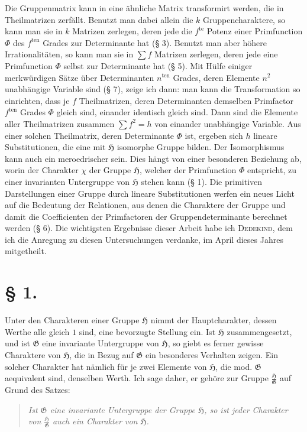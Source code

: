\documentclass[11pt]{article}
\newcommand{\Hgrp}{\mathfrak{H}}
\newcommand{\Ggrp}{\mathfrak{G}}
\newcommand{\ten}{\mathrm{ten}}
\begin{document}
Die Gruppenmatrix kann in eine ähnliche Matrix transformirt werden, die in Theilmatrizen zerfällt. Benutzt man dabei allein die $k$ Gruppencharaktere, so kann man sie in $k$ Matrizen zerlegen, deren jede die $f^{\mathrm{te}}$ Potenz einer Primfunction $\Phi$ des $f^{\ten}$ Grades zur Determinante hat (§ 3). Benutzt man aber höhere Irrationalitäten, so kann man sie in $\sum f$ Matrizen zerlegen, deren jede eine Primfunction $\Phi$ selbst zur Determinante hat (§ 5). Mit Hülfe einiger merkwürdigen Sätze über Determinanten $n^{\ten}$ Grades, deren Elemente $n^2$ unabhängige Variable sind (§ 7), zeige ich dann: man kann die Transformation so einrichten, dass je $f$ Theilmatrizen, deren Determinanten demselben Primfactor $f^{\ten}$ Grades $\Phi$ gleich sind, einander identisch gleich sind. Dann sind die Elemente aller Theilmatrizen zusammen $\sum f^2=h$ von einander unabhängige Variable. Aus einer solchen Theilmatrix, deren Determinante $\Phi$ ist, ergeben sich $h$ lineare Substitutionen, die eine mit $\Hgrp$ isomorphe Gruppe bilden. Der Isomorphismus kann auch ein meroedrischer sein. Dies hängt von einer besonderen Beziehung ab, worin der Charakter $\chi$ der Gruppe $\Hgrp$, welcher der Primfunction $\Phi$ entspricht, zu einer invarianten Untergruppe von $\Hgrp$ stehen kann (§ 1). Die primitiven Darstellungen einer Gruppe durch lineare Substitutionen werfen ein neues Licht auf die Bedeutung der Relationen, aus denen die Charaktere der Gruppe und damit die Coefficienten der Primfactoren der Gruppendeterminante berechnet werden (§ 6). Die wichtigsten Ergebnisse dieser Arbeit habe ich \textsc{Dedekind}, dem ich die Anregung zu diesen Untersuchungen verdanke, im April dieses Jahres mitgetheilt.

\section*{§ 1.}

Unter den Charakteren einer Gruppe $\Hgrp$ nimmt der Hauptcharakter, dessen Werthe alle gleich $1$ sind, eine bevorzugte Stellung ein. Ist $\Hgrp$ zusammengesetzt, und ist $\Ggrp$ eine invariante Untergruppe von $\Hgrp$, so giebt es ferner gewisse Charaktere von $\Hgrp$, die in Bezug auf $\Ggrp$ ein besonderes Verhalten zeigen. Ein solcher Charakter hat nämlich für je zwei Elemente von $\Hgrp$, die mod. $\Ggrp$ aequivalent sind, denselben Werth. Ich sage daher, er gehöre zur Gruppe $\frac{\Hgrp}{\Ggrp}$ auf Grund des Satzes:

\begin{quote}\itshape
Ist $\Ggrp$ eine invariante Untergruppe der Gruppe $\Hgrp$, so ist jeder Charakter von $\frac{\Hgrp}{\Ggrp}$ auch ein Charakter von $\Hgrp$.
\end{quote}
\end{document}
